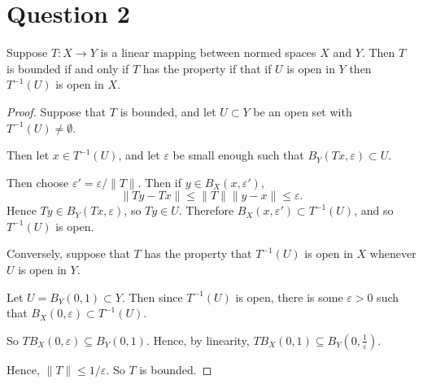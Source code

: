 \documentclass{unswmaths}
\begin{document}
\section*{Question 2}
\begin{theorem}
    Suppose $T:X\rightarrow Y$ is a linear mapping between normed spaces $X$ and $Y$. Then $T$ is bounded
    if and only if $T$ has the property if that if $U$ is open in $Y$ then $T^{-1}(U)$ is open in $X$.
\end{theorem}
\begin{proof}
    Suppose that $T$ is bounded, and let $U\subset Y$ be an open set with $T^{-1}(U) \neq \emptyset$. 
    
    Then let $x \in T^{-1}(U)$, and let $\varepsilon$ be small enough such that $B_Y(Tx,\varepsilon) \subset U$. 
    
    Then choose $\varepsilon' = \varepsilon/\|T\|$. Then if $y \in B_X(x, \varepsilon')$, 
    \begin{equation*}
        \|Ty-Tx\| \leq \|T\|\|y-x\| \leq \varepsilon.
    \end{equation*}
    Hence $Ty \in B_Y(Tx,\varepsilon)$, so $Ty \in U$. Therefore $B_X(x,\varepsilon') \subset T^{-1}(U)$, and so $T^{-1}(U)$
    is open.
    
    Conversely, suppose that $T$ has the property that $T^{-1}(U)$ is open in $X$ whenever $U$ is open in $Y$.
    
    Let $U = B_Y(0,1) \subset Y$. Then since $T^{-1}(U)$ is open, there is some $\varepsilon > 0$ such
    that $B_X(0,\varepsilon) \subset T^{-1}(U)$.
    
    So $TB_X(0,\varepsilon) \subseteq B_Y(0,1)$. Hence, by linearity, $TB_X(0,1) \subseteq B_Y(0,\frac{1}{\varepsilon})$.
    
    Hence, $\|T\| \leq 1/\varepsilon$. So $T$ is bounded.
    
\end{proof}
\end{document}
